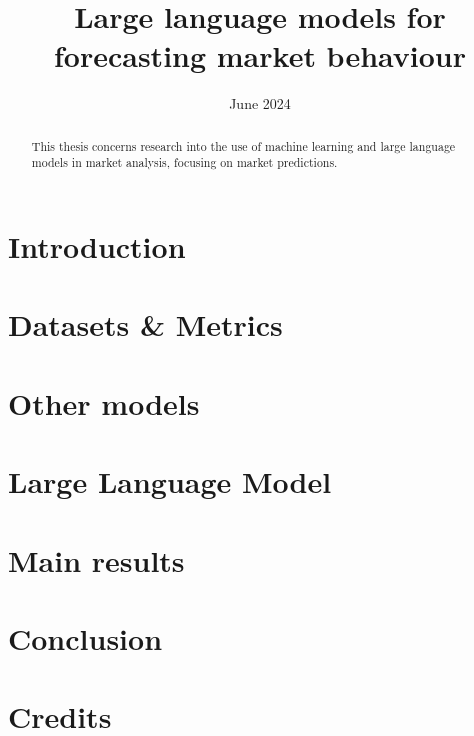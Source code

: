 \documentclass[licencjacka, en]{pracamgr}
\title{Large language models for forecasting market behaviour}
\date{June 2024}
\begin{document}
\newcommand{\rozdzial}[2]{
	\chapter{#1}
	\label{chap:#2}
	
}

\maketitle

\begin{abstract}
	This thesis concerns research into the use of machine learning
	and large language models in market analysis, focusing on market
	predictions.
\end{abstract}

\tableofcontents

\rozdzial{Introduction}{introduction}
\rozdzial{Datasets \& Metrics}{preliminary-definitions}
\rozdzial{Other models}{other-models}
\rozdzial{Large Language Model}{large-language-model}
\rozdzial{Main results}{results}
\rozdzial{Conclusion}{conclusion}
\rozdzial{Credits}{credits}

\end{document}
